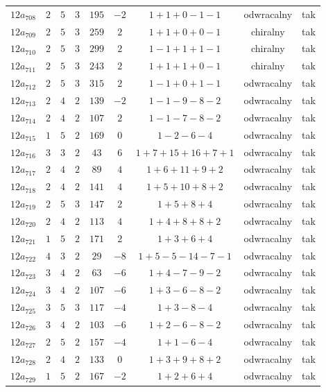 \begin{longtable}{ccccccccc}
$12a_{708}$ & $2$ & $5$ & $3$ & $195$ & $-2$ & $1+1+0-1-1$ & odwracalny & tak \\
$12a_{709}$ & $2$ & $5$ & $3$ & $259$ & $2$ & $1+1+0+0-1$ & chiralny & tak \\
$12a_{710}$ & $2$ & $5$ & $3$ & $299$ & $2$ & $1-1+1+1-1$ & chiralny & tak \\
$12a_{711}$ & $2$ & $5$ & $3$ & $243$ & $2$ & $1+1+1+0-1$ & chiralny & tak \\
$12a_{712}$ & $2$ & $5$ & $3$ & $315$ & $2$ & $1-1+0+1-1$ & odwracalny & tak \\
$12a_{713}$ & $2$ & $4$ & $2$ & $139$ & $-2$ & $1-1-9-8-2$ & odwracalny & tak \\
$12a_{714}$ & $2$ & $4$ & $2$ & $107$ & $2$ & $1-1-7-8-2$ & odwracalny & tak \\
$12a_{715}$ & $1$ & $5$ & $2$ & $169$ & $0$ & $1-2-6-4$ & odwracalny & tak \\
$12a_{716}$ & $3$ & $3$ & $2$ & $43$ & $6$ & $1+7+15+16+7+1$ & odwracalny & tak \\
$12a_{717}$ & $2$ & $4$ & $2$ & $89$ & $4$ & $1+6+11+9+2$ & odwracalny & tak \\
$12a_{718}$ & $2$ & $4$ & $2$ & $141$ & $4$ & $1+5+10+8+2$ & odwracalny & tak \\
$12a_{719}$ & $2$ & $5$ & $3$ & $147$ & $2$ & $1+5+8+4$ & odwracalny & tak \\
$12a_{720}$ & $2$ & $4$ & $2$ & $113$ & $4$ & $1+4+8+8+2$ & odwracalny & tak \\
$12a_{721}$ & $1$ & $5$ & $2$ & $171$ & $2$ & $1+3+6+4$ & odwracalny & tak \\
$12a_{722}$ & $4$ & $3$ & $2$ & $29$ & $-8$ & $1+5-5-14-7-1$ & odwracalny & tak \\
$12a_{723}$ & $3$ & $4$ & $2$ & $63$ & $-6$ & $1+4-7-9-2$ & odwracalny & tak \\
$12a_{724}$ & $3$ & $4$ & $2$ & $107$ & $-6$ & $1+3-6-8-2$ & odwracalny & tak \\
$12a_{725}$ & $3$ & $5$ & $3$ & $117$ & $-4$ & $1+3-8-4$ & odwracalny & tak \\
$12a_{726}$ & $3$ & $4$ & $2$ & $103$ & $-6$ & $1+2-6-8-2$ & odwracalny & tak \\
$12a_{727}$ & $2$ & $5$ & $2$ & $157$ & $-4$ & $1+1-6-4$ & odwracalny & tak \\
$12a_{728}$ & $2$ & $4$ & $2$ & $133$ & $0$ & $1+3+9+8+2$ & odwracalny & tak \\
$12a_{729}$ & $1$ & $5$ & $2$ & $167$ & $-2$ & $1+2+6+4$ & odwracalny & tak \\

\end{longtable}
